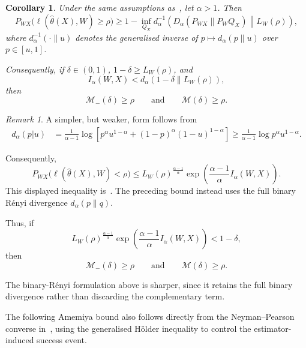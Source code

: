 \documentclass[11pt]{article}
\newtheorem{corollary}[theorem]{Corollary}
\theoremstyle{definition}
\theoremstyle{remark}
\newtheorem{remark}[theorem]{Remark}
\newcommand{\1}{\boldsymbol{1}}
\begin{document}
\begin{corollary}
\label{cor:renyiSibson}
Under the same assumptions as~, let $\alpha>1$. Then
\begin{equation}
P_{WX}\bigl(\ell(\widehat\theta(X),W)\geq\rho\bigr)
\geq
1-
\inf_{Q_X}
d_\alpha^{-1}
\left(
D_\alpha(P_{WX}\|P_WQ_X)
\middle\|
L_W(\rho)
\right),
\end{equation}
where $d_\alpha^{-1}(\cdot\|u)$ denotes the generalised inverse of
$p\mapsto d_\alpha(p\|u)$ over $p\in[u,1]$.

Consequently, if $\delta\in(0,1)$, $1-\delta\geq L_W(\rho)$, and
\begin{equation}
I_\alpha(W,X)
<
d_\alpha
\left(
1-\delta
\middle\|
L_W(\rho)
\right),
\end{equation}
then
\begin{equation}
\mathcal M_{-}(\delta)\geq\rho
\qquad\text{and}\qquad
\mathcal M(\delta)\geq\rho.
\end{equation}
\end{corollary}


\begin{remark}
\label{rmk:holderSibsonBound}
A simpler, but weaker, form follows from
\begin{align}
d_\alpha(p|u)&=\frac{1}{\alpha-1}\log\left[p^\alpha u^{1-\alpha}+(1-p)^\alpha(1-u)^{1-\alpha}\right]\geq\frac{1}{\alpha-1}\log p^\alpha u^{1-\alpha}.
\end{align}

Consequently,
\begin{equation}
P_{WX}\bigl(\ell(\widehat\theta(X),W)<\rho\bigr)\leq L_W(\rho)^{\frac{\alpha-1}{\alpha}}\exp\left(\frac{\alpha-1}{\alpha}I_\alpha(W,X)\right).
\end{equation}
This displayed inequality is~\cite[Theorem~8]{EspositoVandenbroucqueGastpar2024}. The preceding bound instead uses the full binary R\'enyi divergence $d_\alpha(p\|q)$.

Thus, if
\begin{equation}
L_W(\rho)^{\frac{\alpha-1}{\alpha}}\exp\left(\frac{\alpha-1}{\alpha}I_\alpha(W,X)\right)<1-\delta,
\end{equation}
then
\[\mathcal M_{-}(\delta)\geq\rho\qquad\text{and}\qquad\mathcal M(\delta)\geq\rho.\]

The binary-R\'enyi formulation above is sharper, since it retains the full binary divergence rather than discarding the complementary term.
\end{remark}

The following Amemiya bound also follows directly from the Neyman--Pearson
converse in~, using the generalised H\"older
inequality to control the estimator-induced success event.
\end{document}
